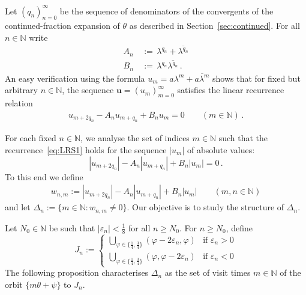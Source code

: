 \documentclass[a4paper,UKenglish,cleveref, autoref, thm-restate]{lipics-v2021}
\begin{document}
Let $(q_n)_{n=0}^\infty$ be the sequence of denominators of the convergents of 
the continued-fraction expansion of $\theta$ as described in Section~\ref{sec:continued}.
For all $n \in \mathbb N$ write
\begin{equation}
    \begin{aligned}
    A_n &\, :=\, \lambda^{q_n}+\overline{\lambda^{q_n}} \\
    B_n &\, :=\, \lambda^{q_n}\overline{\lambda^{q_n}} \, .
\end{aligned}
\label{eq:anbn}
\end{equation}
An easy verification using the formula $u_m=a\lambda^m +\overline{a\lambda^m}$
shows that for fixed but arbitrary $n\in \mathbb N$, the sequence $\boldsymbol u=(u_m)_{m=0}^\infty$ satisfies the linear recurrence relation
\begin{gather}
u_{m+2q_n}-A_nu_{m+q_n}+B_n u_m=0 \qquad (m\in \mathbb N) \, .
\label{eq:LRS1}
\end{gather}

For each fixed $n\in \mathbb N$, we analyse the set of indices $m\in \mathbb N$ such that the recurrence~\eqref{eq:LRS1} holds for the sequence $|u_m|$ of absolute values:
\[
|u_{m+2q_n}|-A_n|u_{m+q_n}|+B_n |u_m|=0\, .
\]
To this end we define
\begin{gather}
w_{n,m}:=
|u_{m+2q_n}|-A_n|u_{m+q_n}|+B_n|u_m| \qquad (m,n\in\mathbb N)
\label{eq:def-w}
\end{gather}
and let $\Delta_n:=\{m\in\mathbb N: w_{n,m}\neq 0 \}$.  Our objective is to study the structure of $\Delta_n$.

Let $N_0\in\mathbb N$ be such that $|\varepsilon_n|<\frac{1}{8}$ for all $n\geq N_0$.  For $n\geq N_0$, define
\[ J_n:= \begin{cases}
   \bigcup_{\varphi\in \{\frac{1}{4},\frac{3}{4}\}} \left(\varphi-2\varepsilon_n,\varphi\right)& \text{if $\varepsilon_n>0$}\\
    \bigcup_{\varphi\in \{\frac{1}{4},\frac{3}{4}\}}   \left(\varphi,\varphi-2\varepsilon_n\right)  & \text{if $\varepsilon_n<0$}
\end{cases}\]
The following proposition characterises $\Delta_n$ as the set of visit times $m\in \mathbb N$ of the orbit 
$\{m\theta+\psi\}$ to $J_n$.
\end{document}
